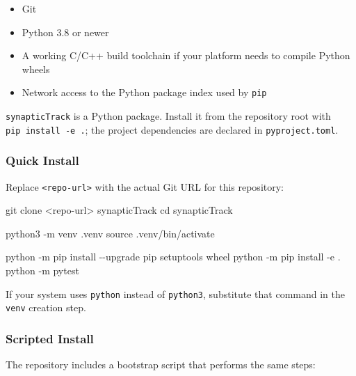 \documentclass[
]{article}
\newenvironment{Shaded}{}{}
\newcommand{\AttributeTok}[1]{\textcolor[rgb]{0.49,0.56,0.16}{#1}}
\newcommand{\BuiltInTok}[1]{\textcolor[rgb]{0.00,0.50,0.00}{#1}}
\newcommand{\ExtensionTok}[1]{#1}
\newcommand{\FunctionTok}[1]{\textcolor[rgb]{0.02,0.16,0.49}{#1}}
\newcommand{\NormalTok}[1]{#1}
\newcommand{\OperatorTok}[1]{\textcolor[rgb]{0.40,0.40,0.40}{#1}}
\providecommand{\tightlist}{%
  \setlength{\itemsep}{0pt}\setlength{\parskip}{0pt}}
\begin{document}
\begin{itemize}
\tightlist
\item
  Git
\item
  Python 3.8 or newer
\item
  A working C/C++ build toolchain if your platform needs to compile
  Python wheels
\item
  Network access to the Python package index used by \texttt{pip}
\end{itemize}

\texttt{synapticTrack} is a Python package. Install it from the
repository root with \texttt{pip\ install\ -e\ .}; the project
dependencies are declared in \texttt{pyproject.toml}.

\hypertarget{quick-install}{%
\subsubsection{Quick Install}\label{quick-install}}

Replace \texttt{\textless{}repo-url\textgreater{}} with the actual Git
URL for this repository:

\begin{Shaded}
\begin{Highlighting}[]
\FunctionTok{git}\NormalTok{ clone }\OperatorTok{\textless{}}\NormalTok{repo{-}url}\OperatorTok{\textgreater{}}\NormalTok{ synapticTrack}
\BuiltInTok{cd}\NormalTok{ synapticTrack}

\ExtensionTok{python3} \AttributeTok{{-}m}\NormalTok{ venv .venv}
\BuiltInTok{source}\NormalTok{ .venv/bin/activate}

\ExtensionTok{python} \AttributeTok{{-}m}\NormalTok{ pip install }\AttributeTok{{-}{-}upgrade}\NormalTok{ pip setuptools wheel}
\ExtensionTok{python} \AttributeTok{{-}m}\NormalTok{ pip install }\AttributeTok{{-}e}\NormalTok{ .}
\ExtensionTok{python} \AttributeTok{{-}m}\NormalTok{ pytest}
\end{Highlighting}
\end{Shaded}

If your system uses \texttt{python} instead of \texttt{python3},
substitute that command in the \texttt{venv} creation step.

\hypertarget{scripted-install}{%
\subsubsection{Scripted Install}\label{scripted-install}}

The repository includes a bootstrap script that performs the same steps:
\end{document}
